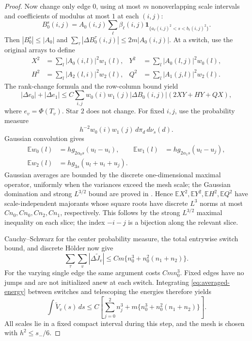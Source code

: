 \documentclass[11pt,a4paper]{article}
\theoremstyle{definition}
\newcommand{\1}{\mathbf1}
\newcommand{\E}{\mathbb E}
\begin{document}
\begin{proof}
Now change only edge $0$, using at most $m$ nonoverlapping scale
intervals and coefficients of modulus at most $1$ at each $(i,j)$:
\[
 B_0^s(i,j)=A_0(i,j)\sum_\ell\beta_\ell(i,j)
                  \1_{\{a_\ell(i,j)^2<s<b_\ell(i,j)^2\}}.
\]
Then $|B_0^s|\le|A_0|$ and
$\sum_\tau|\Delta B_0^\tau(i,j)|\le2m|A_0(i,j)|$.
At a switch, use the original arrays to define
\begin{align*}
 X^2&=\sum_l|A_0(i,l)|^2w_1(l),&Y^2&=\sum_l|A_0(l,j)|^2w_0(l),\\
 H^2&=\sum_l|A_2(l,i)|^2w_2(l),&Q^2&=\sum_l|A_1(j,l)|^2w_2(l).
\end{align*}
The rank-change formula and the row-column bound yield
\[
 |\Delta e_0|+|\Delta e_1|
 \le C\sum_{i,j}w_0(i)w_1(j)|\Delta B_0(i,j)|(2XY+HY+QX),
\]
where $e_v=\Phi(T_v)$. Star $2$ does not change.
For fixed $i,j$, use the probability measure
\[
 h^{-2}w_0(i)w_1(j)\,d\pi_d\,d\nu_s(d).
\]
Gaussian convolution gives
\begin{align*}
 \E w_0(l)&=h g_{2\alpha_0s}(u_l-u_i),&
 \E w_1(l)&=h g_{2\alpha_1s}(u_l-u_j),\\
 \E w_2(l)&=h g_{3s}(u_l+u_i+u_j).
\end{align*}
Gaussian averages are bounded by the discrete one-dimensional maximal
operator, uniformly when the variances exceed the mesh scale; the
Gaussian domination and strong $L^{3/2}$ bound are proved in
\cite[Lemma \texttt{lem:line-maximal}]{FrozenPreliminaries}. Hence
$\E X^2,\E Y^2,\E H^2,\E Q^2$ have scale-independent majorants whose
square roots have discrete $L^3$ norms at most
$Cn_0,Cn_0,Cn_2,Cn_1$, respectively. This follows by the strong
$L^{3/2}$ maximal inequality on each slice; the index $-i-j$ is a
bijection along the relevant slice.

Cauchy--Schwarz for the center probability measure, the total entrywise
switch bound, and discrete H\"older now give
\[
 \sum_\tau\sum_v|\Delta\widetilde J_v|
 \le Cm\{n_0^3+n_0^2(n_1+n_2)\}.
\]
For the varying single edge the same argument costs $Cm n_0^3$.
Fixed edges have no jumps and are not initialized anew at each switch.
Integrating \eqref{eq:averaged-energy} between switches and telescoping
the energies therefore yields
\begin{equation}\label{eq:budget-candidate}
 \int\widetilde V_v(s)\,ds
 \le C\left[\sum_{j=0}^2 n_j^3+
                 m\{n_0^3+n_0^2(n_1+n_2)\}\right].
\end{equation}
All scales lie in a fixed compact interval during this step, and the
mesh is chosen with $h^2\le s_-/6$.


\end{proof}
\end{document}
